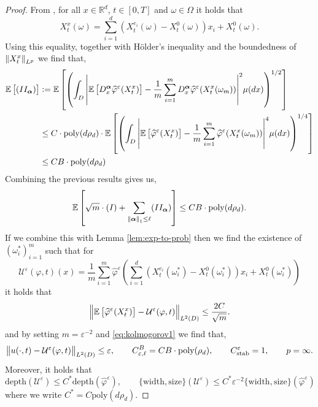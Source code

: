 \documentclass{article}
\numberwithin{equation}{section}
\newcommand{\poly}{\mathrm{poly}}
\newcommand{\size}{\mathrm{size}}
\newcommand{\width}{\mathrm{width}}
\newcommand{\depth}{\mathrm{depth}}
\newcommand{\cU}{\mathcal{U}}
\newcommand{\bmalpha}{{\bm{\alpha}}}
\renewcommand{\epsilon}{\varepsilon}
\newcommand{\1}{\mathbbm{1}}
\newcommand{\varphihat}{{\widehat{\varphi}}}
\newcommand{\E}[1]{{\mathbb{E}\left[ #1 \right]}} %
\begin{document}
\begin{proof}
From \cite[Lemma A.5]{deryck2021pinn}, for all $x\in\mathbb{R}^d$, $t\in[0,T]$ and $\omega\in\Omega$ it holds that
    \begin{equation}
    X^x_t(\omega) = \sum_{i=1}^d \left(X^{e_i}_t(\omega)-X^0_t(\omega)\right)x_i + X^0_t(\omega).
\end{equation}
Using this equality, together with Hölder's inequality and the boundedness of $\norm{X^x_t}_{L^p}$ \cite[Lemma A.5]{deryck2021pinn} we find that,
\begin{equation}
\begin{split}
    \E{(II_\bmalpha)}&:=\E{\left(\int_{D}\abs{\E{D^\bmalpha_x \varphihat^\epsilon(X^x_t)}-\frac{1}{m}\sum_{i=1}^m D^\bmalpha_x\varphihat^\epsilon(X^x_t(\omega_m))}^2\mu(dx)\right)^{1/2}}\\
    &\leq C \cdot \poly(d\rho_d)\cdot  \E{\left(\int_{D}\abs{\E{ \varphihat^\epsilon(X^x_t)}-\frac{1}{m}\sum_{i=1}^m \varphihat^\epsilon(X^x_t(\omega_m))}^4\mu(dx)\right)^{1/4}}\\
    &\leq CB \cdot \poly(d\rho_d)
\end{split}
\end{equation}
Combining the previous results gives us,
\begin{equation}
    \E{\sqrt{m}\cdot (I) + \sum_{\norm{\bmalpha}_1\leq \ell}(II_\bmalpha)} \leq CB \cdot \poly(d\rho_d).
\end{equation}
If we combine this with Lemma \ref{lem:exp-to-prob} then we find the existence of $(\omega^*_i)_{i=1}^m$ such that
for 
\begin{equation}
    \cU^\epsilon(\varphi, t)(x) = \frac{1}{m}\sum_{i=1}^m \varphihat^\epsilon\left(\sum_{i=1}^d \left(X^{e_i}_t(\omega^*_i)-X^0_t(\omega^*_i)\right)x_i + X^0_t(\omega^*_i)\right) 
\end{equation}
it holds that
\begin{equation}
    \norm{\E{\varphihat^\epsilon(X^x_t)}-\cU^\epsilon(\varphi, t)}_{L^2(D)} \leq \frac{2C}{\sqrt{m}}. 
\end{equation}
and by setting $m = \epsilon^{-2}$ and  \eqref{eq:kolmogorov1} we find that,
\begin{equation}
    \norm{u(\cdot, t)-\cU^\epsilon(\varphi, t)}_{L^2(D)} \leq \epsilon, \qquad C^B_{\epsilon, \ell} = CB\cdot \poly(\rho_d), \qquad C^\epsilon_{\mathrm{stab}} = 1, \qquad p=\infty. 
\end{equation}
Moreover, it holds that
\begin{equation}
    \depth(\cU^\epsilon) \leq C^* \depth(\varphihat^\epsilon), \qquad \{\width,\size\}(\cU^\epsilon) \leq C^* \epsilon^{-2}  \{\width,\size\}(\varphihat^\epsilon) 
\end{equation}
where we write $C^* = C \poly(d\rho_d) $. 
\end{proof}
\end{document}
